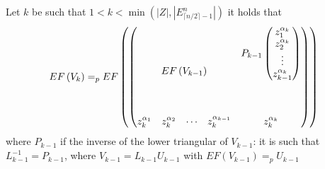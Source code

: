 \documentclass[11pt]{llncs}
\begin{document}
\begin{proposition}\label{prop:rowEchelonForm}
    Let $k$ be such that $1<k< \min{\left(|Z|,|E_{\lceil{n/2}\rceil-1}^n|\right)}$ it holds that
    \begin{align*}
        EF\left(V_{k}\right) =_p
        EF\left( 
        \begin{pmatrix}
    \multicolumn{4}{c}{\phantom{a}\multirow{4}{*}{$EF\left(V_{k-1}\right)$}\phantom{a}} & P_{k-1}\begin{pmatrix}
        z_1^{\alpha_k}\\
        z_2^{\alpha_k}\\
        \vdots\\
        z_{k-1}^{\alpha_{k}}
    \end{pmatrix}\\
    \multicolumn{4}{c}{} & \\
    \multicolumn{4}{c}{} & \\
    \multicolumn{4}{c}{} & \\
    z_k^{\alpha_{1}} & z_k^{\alpha_{2}} & \cdots & z_{k}^{\alpha_{k-1}} & z_{k}^{\alpha_k}
\end{pmatrix}
        \right)
    \end{align*}
    where $P_{k-1}$ if the inverse of the lower triangular of $V_{k-1}$: it is such that $L_{k-1}^{-1} = P_{k-1}$, where $V_{k-1} = L_{k-1}U_{k-1}$ with $EF(V_{k-1})=_p U_{k-1}$
\end{proposition}
\end{document}
